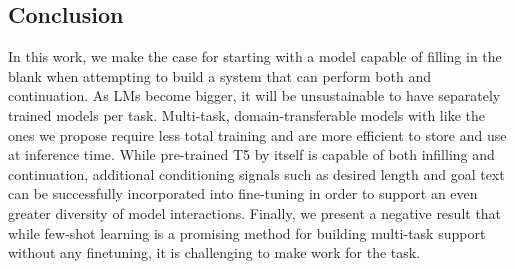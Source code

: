 \subsection{Conclusion}
In this work, we make the case for starting with a model capable of filling in the blank when attempting to build a system that can perform both \FitB{} and continuation.
As LMs become bigger, it will be unsustainable to have separately trained models per task.
Multi-task, domain-transferable models with like the ones we propose require less total training and are more efficient to store and use at inference time.
While pre-trained T5 by itself is capable of both infilling and continuation, additional conditioning signals such as desired length and goal text can be successfully incorporated into fine-tuning in order to support an even greater diversity of model interactions.
Finally, we present a negative result that while few-shot learning is a promising method for
building multi-task support without any finetuning, it is challenging to make work for the \FitB{} task. 



